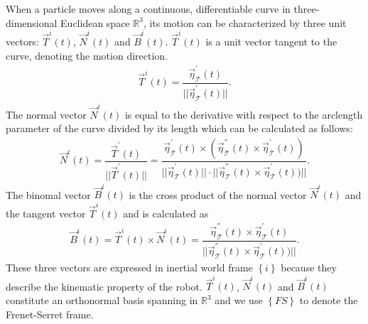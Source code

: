 When a particle moves along a continuous, differentiable curve in three-dimensional Euclidean space $\mathbb{R}^{3}$, its motion can be characterized by three unit vectors: $\vec{T}^{i}(t)$, $\vec{N}^{i}(t)$ and $\vec{B}^{i}(t)$. $\vec{T}^{i}(t)$ is a unit vector tangent to the curve, denoting the motion direction. 
\begin{align}
\vec{T}^{i}(t)=\dfrac{\vec{\eta}_{\mathcal{T}}^{'}(t)}{||\vec{\eta}_{\mathcal{T}}^{'}(t)||}.
\end{align}    
The normal vector $\vec{N}^{i}(t)$ is equal to the derivative with respect to the arclength parameter of the curve divided by its length which can be calculated as follows:
\begin{align}
\vec{N}^{i}(t)=\dfrac{\vec{T}^{'}(t)}{||\vec{T}^{'}(t)||}=
\dfrac{\vec{\eta}_{\mathcal{T}}^{'}(t)\times (\vec{\eta}_{\mathcal{T}}^{''}(t)\times \vec{\eta}_{\mathcal{T}}^{'}(t))}{||\vec{\eta}_{\mathcal{T}}^{'}(t)||\cdot||\vec{\eta}_{\mathcal{T}}^{''}(t)\times \vec{\eta}_{\mathcal{T}}^{'}(t))||}.
\end{align}
The binomal vector $\vec{B}^{i}(t)$ is the cross product of the normal vector $\vec{N}^{i}(t)$ and the tangent vector $\vec{T}^{i}(t)$ and is calculated as 
\begin{align}
\vec{B}^{i}(t)=\vec{T}^{i}(t) \times \vec{N}^{i}(t)=
\dfrac{\vec{\eta}_{\mathcal{T}}^{''}(t)\times \vec{\eta}_{\mathcal{T}}^{'}(t)}{||\vec{\eta}_{\mathcal{T}}^{''}(t)\times \vec{\eta}_{\mathcal{T}}^{'}(t))||}.
\end{align}
These three vectors are expressed in inertial world frame $\left\lbrace i \right\rbrace$ because they describe the kinematic property of the robot. $\vec{T}^{i}(t)$, $\vec{N}^{i}(t)$ and $\vec{B}^{i}(t)$ constitute an orthonormal basis spanning in $\mathbb{R}^{3}$ and we use $\left\lbrace FS\right\rbrace$ to denote the Frenet-Serret frame.

